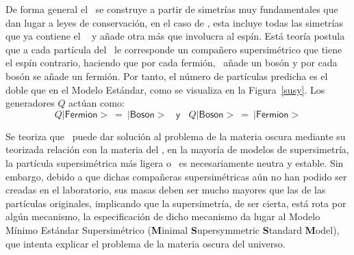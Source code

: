 De forma general el \ME ~se construye a partir de simetrías muy fundamentales que dan lugar a leyes de conservación, en el caso de \SUSY, esta incluye todas las simetrías que ya contiene el \ME~ y añade otra más que involucra al espín. Está teoría postula que a cada partícula del \ME ~le corresponde un compañero supersimétrico que tiene el espín contrario, haciendo que por cada fermión, \SUSY ~añade un bosón y por cada bosón se añade un fermión. Por tanto, el número de partículas predicha es el doble que en el Modelo Estándar, como se visualiza en la Figura~\ref{susy}. Los generadores $Q$ actúan como:
\begin{equation}
Q|\textsf{Fermion}> ~ = ~ |\textsf{Boson}> ~~~~ \textsf{y} ~~~~ Q|\textsf{Boson}> ~ = ~ |\textsf{Fermion}>
\end{equation}

Se teoriza que \SUSY ~puede dar solución al problema de la materia oscura mediante su teorizada relación con la materia del \ME, en la mayoría de modelos de supersimetría, la partícula supersimétrica más ligera o \LSP ~es necesariamente neutra y estable. %
Sin embargo, debido a que dichas compañeras supersimétricas aún no han podido ser creadas en el laboratorio, sus masas deben ser mucho mayores que las de las partículas originales, implicando que la supersimetría, de ser cierta, está rota por algún mecanismo, la especificación de dicho mecanismo da lugar al Modelo Mínimo Estándar Supersimétrico \MSSM(\textbf{M}inimal \textbf{S}upersymmetric \textbf{S}tandard \textbf{M}odel), que intenta explicar el problema de la materia oscura del universo.





 